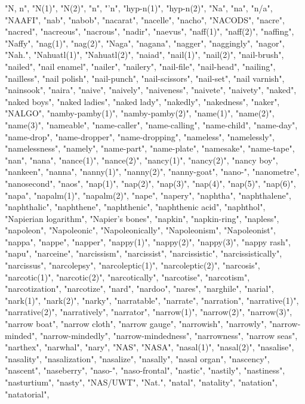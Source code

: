 "N, n",
"N(1)",
"N(2)",
"n",
"'n",
"hyp-n(1)",
"hyp-n(2)",
"Na",
"na",
"n/a",
"NAAFI",
"nab",
"nabob",
"nacarat",
"nacelle",
"nacho",
"NACODS",
"nacre",
"nacred",
"nacreous",
"nacrous",
"nadir",
"naevus",
"naff(1)",
"naff(2)",
"naffing",
"Naffy",
"nag(1)",
"nag(2)",
"Naga",
"nagana",
"nagger",
"naggingly",
"nagor",
"Nah.",
"Nahuatl(1)",
"Nahuatl(2)",
"naiad",
"nail(1)",
"nail(2)",
"nail-brush",
"nailed",
"nail enamel",
"nailer",
"nailery",
"nail-file",
"nail-head",
"nailing",
"nailless",
"nail polish",
"nail-punch",
"nail-scissors",
"nail-set",
"nail varnish",
"nainsook",
"naira",
"naive",
"naively",
"naiveness",
"naivete",
"naivety",
"naked",
"naked boys",
"naked ladies",
"naked lady",
"nakedly",
"nakedness",
"naker",
"NALGO",
"namby-pamby(1)",
"namby-pamby(2)",
"name(1)",
"name(2)",
"name(3)",
"nameable",
"name-caller",
"name-calling",
"name-child",
"name-day",
"name-drop",
"name-dropper",
"name-dropping",
"nameless",
"namelessly",
"namelessness",
"namely",
"name-part",
"name-plate",
"namesake",
"name-tape",
"nan",
"nana",
"nance(1)",
"nance(2)",
"nancy(1)",
"nancy(2)",
"nancy boy",
"nankeen",
"nanna",
"nanny(1)",
"nanny(2)",
"nanny-goat",
"nano-",
"nanometre",
"nanosecond",
"naos",
"nap(1)",
"nap(2)",
"nap(3)",
"nap(4)",
"nap(5)",
"nap(6)",
"napa",
"napalm(1)",
"napalm(2)",
"nape",
"napery",
"naphtha",
"naphthalene",
"naphthalic",
"naphthene",
"naphthenic",
"naphthenic acid",
"naphthol",
"Napierian logarithm",
"Napier's bones",
"napkin",
"napkin-ring",
"napless",
"napoleon",
"Napoleonic",
"Napoleonically",
"Napoleonism",
"Napoleonist",
"nappa",
"nappe",
"napper",
"nappy(1)",
"nappy(2)",
"nappy(3)",
"nappy rash",
"napu",
"narceine",
"narcissism",
"narcissist",
"narcissistic",
"narcissistically",
"narcissus",
"narcolepsy",
"narcoleptic(1)",
"narcoleptic(2)",
"narcosis",
"narcotic(1)",
"narcotic(2)",
"narcotically",
"narcotise",
"narcotism",
"narcotization",
"narcotize",
"nard",
"nardoo",
"nares",
"narghile",
"narial",
"nark(1)",
"nark(2)",
"narky",
"narratable",
"narrate",
"narration",
"narrative(1)",
"narrative(2)",
"narratively",
"narrator",
"narrow(1)",
"narrow(2)",
"narrow(3)",
"narrow boat",
"narrow cloth",
"narrow gauge",
"narrowish",
"narrowly",
"narrow-minded",
"narrow-mindedly",
"narrow-mindedness",
"narrowness",
"narrow seas",
"narthex",
"narwhal",
"nary",
"NAS",
"NASA",
"nasal(1)",
"nasal(2)",
"nasalise",
"nasality",
"nasalization",
"nasalize",
"nasally",
"nasal organ",
"nascency",
"nascent",
"naseberry",
"naso-",
"naso-frontal",
"nastic",
"nastily",
"nastiness",
"nasturtium",
"nasty",
"NAS/UWT",
"Nat.",
"natal",
"natality",
"natation",
"natatorial",
